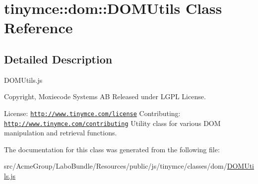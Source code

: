 \hypertarget{classtinymce_1_1dom_1_1_d_o_m_utils}{\section{tinymce\+:\+:dom\+:\+:D\+O\+M\+Utils Class Reference}
\label{classtinymce_1_1dom_1_1_d_o_m_utils}
}


\subsection{Detailed Description}
D\+O\+M\+Utils.\+js

Copyright, Moxiecode Systems A\+B Released under L\+G\+P\+L License.

License\+: \href{http://www.tinymce.com/license}{\tt http\+://www.\+tinymce.\+com/license} Contributing\+: \href{http://www.tinymce.com/contributing}{\tt http\+://www.\+tinymce.\+com/contributing} Utility class for various D\+O\+M manipulation and retrieval functions. 

The documentation for this class was generated from the following file\+:\begin{DoxyCompactItemize}
\item 
src/\+Acme\+Group/\+Labo\+Bundle/\+Resources/public/js/tinymce/classes/dom/\hyperlink{dom_2_d_o_m_utils_8js}{D\+O\+M\+Utils.\+js}\end{DoxyCompactItemize}
